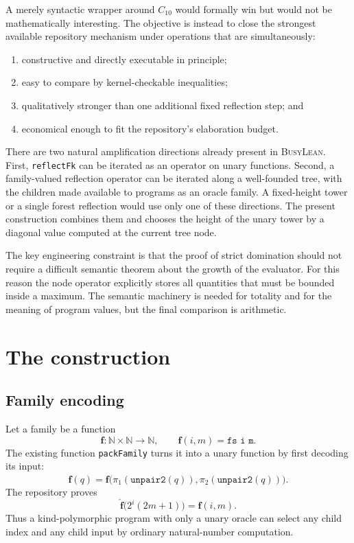 \documentclass[11pt]{article}
\theoremstyle{definition}
\theoremstyle{remark}
\newcommand{\N}{\mathbb{N}}
\newcommand{\Cten}{\ensuremath{C_{10}}}
\newcommand{\code}[1]{\texttt{#1}}
\newcommand{\repo}{\textsc{BusyLean}}
\begin{document}
A merely syntactic wrapper around \Cten{} would formally win but would not be
mathematically interesting. The objective is instead to close the strongest
available repository mechanism under operations that are simultaneously:

\begin{enumerate}[leftmargin=*]
\item constructive and directly executable in principle;
\item easy to compare by kernel-checkable inequalities;
\item qualitatively stronger than one additional fixed reflection step; and
\item economical enough to fit the repository's elaboration budget.
\end{enumerate}

There are two natural amplification directions already present in \repo{}.
First, \code{reflectFk} can be iterated as an operator on unary functions.
Second, a family-valued reflection operator can be iterated along a
well-founded tree, with the children made available to programs as an oracle
family. A fixed-height tower or a single forest reflection would use only one
of these directions. The present construction combines them and chooses the
height of the unary tower by a diagonal value computed at the current tree
node.

The key engineering constraint is that the proof of strict domination should
not require a difficult semantic theorem about the growth of the evaluator.
For this reason the node operator explicitly stores all quantities that must
be bounded inside a maximum. The semantic machinery is needed for totality and
for the meaning of program values, but the final comparison is arithmetic.

\section{The construction}

\subsection{Family encoding}

Let a family be a function
\[
  \mathbf f : \N\times\N\to\N,
  \qquad \mathbf f(i,m)=\code{fs i m}.
\]
The existing function \code{packFamily} turns it into a unary function by
first decoding its input:
\[
  \widehat{\mathbf f}(q)
  = \mathbf f\bigl(\pi_1(\code{unpair2}(q)),
                    \pi_2(\code{unpair2}(q))\bigr).
\]
The repository proves
\[
  \widehat{\mathbf f}\bigl(2^i(2m+1)\bigr)=\mathbf f(i,m).
\]
Thus a kind-polymorphic program with only a unary oracle can select any child
index and any child input by ordinary natural-number computation.
\end{document}
